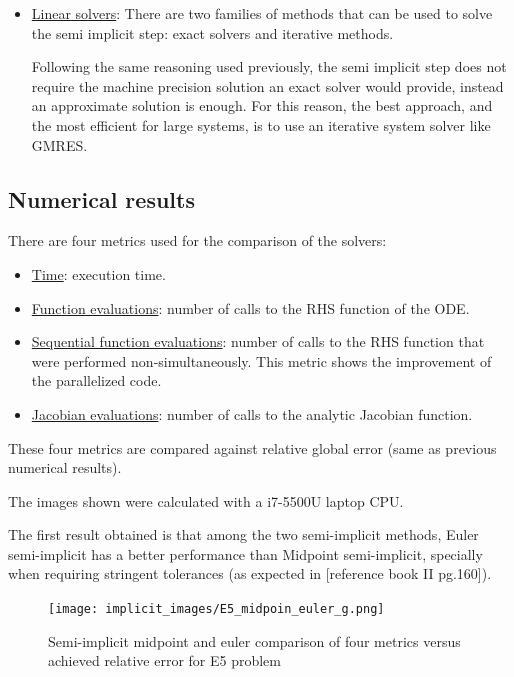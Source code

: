 \documentclass[12pt]{article}
\begin{document}
\begin{itemize}
    \item \underline{Linear solvers}: There are two families of methods that can be used to solve the semi implicit step: exact solvers and iterative methods.
    
    Following the same reasoning used previously, the semi implicit step does not require the machine precision solution an exact solver would provide, instead an approximate solution is enough. For this reason, the best approach, and the most efficient for large systems, is to use an iterative system solver like GMRES.

\end{itemize}


\subsection{Numerical results}

There are four metrics used for the comparison of the solvers:
\begin{itemize}

\item \underline{Time}: execution time.

\item \underline{Function evaluations}: number of calls to the RHS function of the ODE.

\item \underline{Sequential function evaluations}: number of calls to the RHS function that were performed non-simultaneously. This metric shows the improvement of the parallelized code. 

\item \underline{Jacobian evaluations}: number of calls to the analytic Jacobian function.

\end{itemize}

These four metrics are compared against relative global error (same as previous numerical results).

The images shown were calculated with a i7-5500U laptop CPU.

The first result obtained is that among the two semi-implicit methods, Euler semi-implicit has a better performance than Midpoint semi-implicit, specially when requiring stringent tolerances (as expected in [reference book II pg.160]).

\begin{figure}[h]
 \texttt{[image: implicit\_images/E5\_midpoin\_euler\_g.png]}
\centering
\caption{Semi-implicit midpoint and euler comparison of four metrics versus achieved relative error for E5 problem}
\end{figure}
\end{document}
